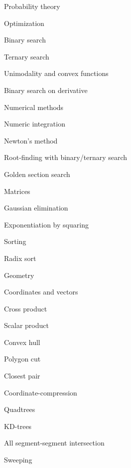 \begin{myitemize}
\begin{myitemize}
\end{myitemize}
\item Probability theory
\begin{myitemize}
\item Optimization
	\item Binary search
	\item Ternary search
	\item Unimodality and convex functions
	\item Binary search on derivative
\end{myitemize}
\item Numerical methods
\begin{myitemize}
	\item Numeric integration
	\item Newton's method
	\item Root-finding with binary/ternary search
	\item Golden section search
\end{myitemize}
\item Matrices
\begin{myitemize}
	\item Gaussian elimination
	\item Exponentiation by squaring
\end{myitemize}
\item Sorting
\begin{myitemize}
	\item Radix sort
\end{myitemize}
\item Geometry
\begin{myitemize}
	\item Coordinates and vectors
	\begin{myitemize}
		\item Cross product
		\item Scalar product
	\end{myitemize}
	\item Convex hull
	\item Polygon cut
	\item Closest pair
	\item Coordinate-compression
	\item Quadtrees
	\item KD-trees
	\item All segment-segment intersection
\end{myitemize}
\item Sweeping
\begin{myitemize}

\end{myitemize}
\end{myitemize}
